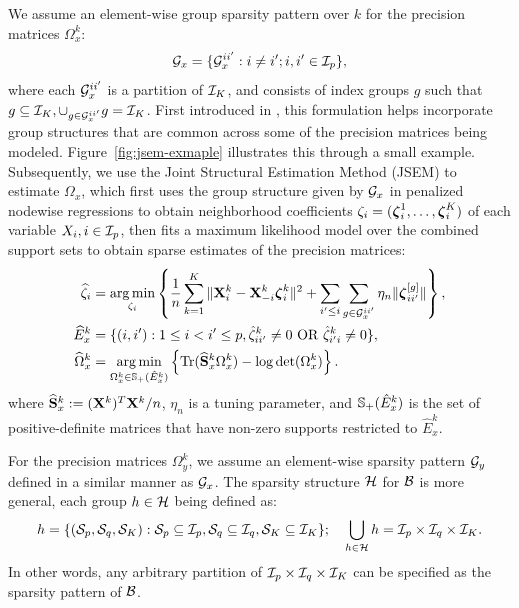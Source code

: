 We assume an element-wise group sparsity pattern over $k$ for the precision matrices $\Omega_x^k$:
%
\[
{\cal{G}}_x = \{ {\cal{G}}_x^{ii'}: i \neq i'; i, i' \in {\cal{I}}_p \},
\]
%
where each ${\cal{G}}_x^{ii'}$ is a partition of ${\cal{I}}_K$, and consists of index groups $g$ such that $g \subseteq {\cal{I}}_K, \cup_{g \in {\cal{G}}_x^{ii'}} g = {\cal{I}}_K$. First introduced in \citet{MaMichailidis15}, this formulation helps incorporate group structures that are common across some of the precision matrices being modeled. Figure~\ref{fig:jsem-exmaple} illustrates this through a small example. Subsequently, we use the Joint Structural Estimation Method (JSEM) \citep{MaMichailidis15} to estimate $\Omega_x$, which first uses the group structure given by ${\cal{G}}_x$ in penalized nodewise regressions \citep{MeisenBuhlmann06} to obtain neighborhood coefficients $\zeta_i = ({\boldsymbol{\zeta}}_i^1, \ldots, {\boldsymbol{\zeta}}_i^K)$ of each variable $X_i, i \in {\cal{I}}_p$, {\colb then fits a maximum likelihood model over the combined support sets to obtain sparse estimates of the precision matrices}:
%
\begin{align}\label{eqn:jsem-model}
\widehat \zeta_i &= \operatorname*{arg\,min}_{\zeta_i} \left\{
\frac{1}{n} \sum_{k=1}^K \| {\mathbf{X}}_i^k - {\mathbf{X}}_{-i}^k {\boldsymbol{\zeta}}_i^k \|^2 +
\sum_{i' \leq i} \sum_{g \in {\cal{G}}_x^{ii'}} \eta_n \| {\boldsymbol{\zeta}}_{ii'}^{[g]} \| \right\}, \notag\\
\widehat E_x^k &= \{(i,i'): 1 \leq i < i' \leq p, \hat \zeta_{ii'}^k \neq 0 \text{ OR } \hat \zeta_{i'i}^k \neq 0 \}, \notag\\
\widehat \Omega_x^k &= \operatorname*{arg\,min}_{\Omega_x^k \in {\mathbb{S}}_+ (\hat E_x^k)}
\left\{ \operatorname*{Tr} (\widehat {{\mathbf{S}}}_x^k \Omega_x^k ) - \log \det (\Omega_x^k) \right\}.
\end{align}
%
where $\widehat {{\mathbf{S}}}_x^k := ({\mathbf{X}}^k)^T {\mathbf{X}}^k/n$, $\eta_n$ is a tuning parameter, and ${\mathbb{S}}_+ (\hat E_x^k)$ is the set of positive-definite matrices that have non-zero supports restricted to $\hat E_x^k$.

For the precision matrices $\Omega_y^k$, we assume an element-wise sparsity pattern ${\cal{G}}_y$ defined in a similar manner as ${\cal{G}}_x$. The sparsity structure ${\cal{H}}$ for ${\cal{B}}$ is more general, each group $h \in {\cal{H}}$ being defined as:
%
$$
h = \{ ({\cal{S}}_p, {\cal{S}}_q, {\cal{S}}_K): {\cal{S}}_p \subseteq {\cal{I}}_p, {\cal{S}}_q \subseteq {\cal{I}}_q, {\cal{S}}_K \subseteq {\cal{I}}_K \}
; \quad \bigcup_{h \in {\cal{H}}} h = {\cal{I}}_p \times {\cal{I}}_q \times {\cal{I}}_K.
$$
%
In other words, any arbitrary partition of ${\cal{I}}_p \times {\cal{I}}_q \times {\cal{I}}_K$ can be specified as the sparsity pattern of ${\cal{B}}$.

